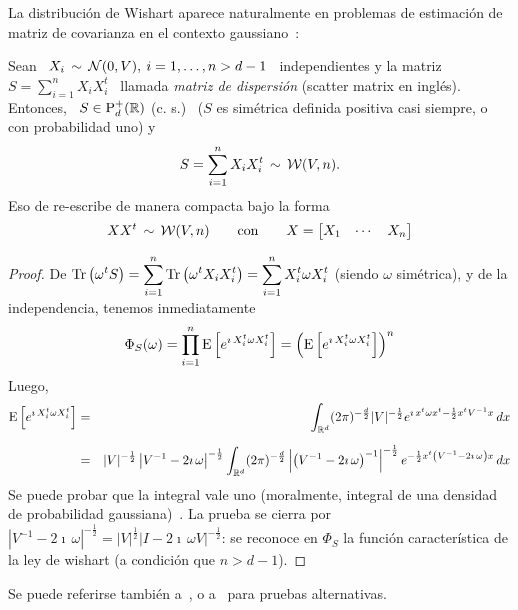 La distribuci\'on  de Wishart aparece naturalmente en  problemas de estimaci\'on
de matriz de covarianza en el contexto gaussiano~\cite{Mui82, BilBre99, GupNag99,
  And03, Seb04, KotNad04}:
%
\begin{lema}\label{Lem:MP:WishartGaussiana}
%
  Sean \ $X_i \, \sim \, \mathcal{N}(0,V), \: i = 1, \ldots , n > d-1$ \ independientes y
  la  matriz  \  $S  =  \sum_{i=1}^n   X_i  X_i^t$  \  llamada  {\em  matriz  de
    dispersi\'on} (scatter matrix en ingl\'es). Entonces, \ $S \in \mathrm{P}_d^+(\mathbb{R})$
  (c.   s.)   \  ($S$ es  sim\'etrica  definida  positiva  casi siempre,  o  con
  probabilidad uno) y \
  \[
  S = \sum_{i=1}^n X_i X_i^t \,\sim \, \mathcal{W}(V,n).
  \]
  Eso de re-escribe de manera compacta bajo la forma
  \[
  X X^t  \,\sim \, \mathcal{W}(V,n)  \qquad \mbox{con} \qquad  X = \begin{bmatrix}  X_1 &
    \cdots & X_n \end{bmatrix}
  \]
\end{lema}
%
\begin{proof}
  De  $\displaystyle  \operatorname{Tr}\left(  \omega^t  S \right)  =  \sum_{i=1}^n  \operatorname{Tr}\left(
    \omega^t  X_i  X_i^t \right)  =  \sum_{i=1}^n  X_i^t  \omega X_i^t$  (siendo
  $\omega$ sim\'etrica), y de la independencia, tenemos inmediatamente
%
\[
\Phi_S(\omega)  =  \prod_{i=1}^n \operatorname{E}\left[  e^{\imath  \,  X_i^t \omega  X_i^t}
\right] = \left( \operatorname{E}\left[ e^{\imath \, X_i^t \omega X_i^t} \right] \right)^n
\]
%
Luego,
%
\begin{eqnarray*}
\Esp\left[ e^{\imath \, X_i^t \omega X_i^t} \right] & = & \int_{\Rset^d} (2
\pi)^{-\frac{d}{2}} |V|^{-\frac12} e^{\imath \, x^t \omega x^t - \frac12 x^t
V^{-1} x} \, dx\\[2mm]
%
& = & |V|^{-\frac12} \left| V^{-1} - 2 \imath \, \omega \right|^{-\frac12}
\int_{\Rset^d} (2 \pi)^{-\frac{d}{2}} \left| \left(V^{-1} - 2 \imath \,
\omega\right)^{-1} \right|^{-\frac12} e^{- \frac12 x^t \left(V^{-1} - 2 \imath
\, \omega \right) x} \, dx
\end{eqnarray*}
%
Se puede probar  que la integral vale uno (moralmente,  integral de una densidad
de  probabilidad gaussiana)~\cite[Teo.~2.1.11]{Mui82}.  La  prueba se  cierra por
$\left| V^{-1} - 2 \imath  \, \omega \right|^{-\frac12} = |V|^{\frac12} \left| I
  -  2  \imath \,  \omega  V \right|^{-\frac12}$:  se  reconoce  en $\Phi_S$  la
funci\'on caracter\'istica de la ley de wishart (a condici\'on que $n > d-1$).
\end{proof}
%
Se    puede   referirse   tambi\'en    a~\cite{GupNag99,   And03,    Seb04},   o
a~\cite[Ej.~7.2]{BilBre99} para pruebas alternativas.

